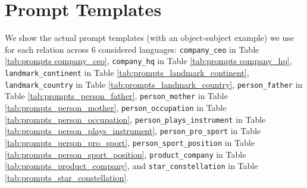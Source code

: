 \section{Prompt Templates}

We show the actual prompt templates (with an object-subject example) we use for each relation across 6 considered languages:
\texttt{company\_ceo} in Table \ref{tab:prompts company_ceo}, 
\texttt{company\_hq} in Table \ref{tab:prompts company_hq},
\texttt{landmark\_continent} in Table \ref{tab:prompts_landmark_continent},
\texttt{landmark\_country} in Table \ref{tab:prompts_landmark_country},
\texttt{person\_father} in Table \ref{tab:prompts_person_father},
\texttt{person\_mother} in Table \ref{tab:prompts_person_mother},
\texttt{person\_occupation} in Table \ref{tab:prompts_person_occupation},
\texttt{person\_plays\_instrument} in Table \ref{tab:prompts_person_plays_instrument},
\texttt{person\_pro\_sport} in Table \ref{tab:prompts_person_pro_sport},
\texttt{person\_sport\_position} in Table \ref{tab:prompts_person_sport_position},
\texttt{product\_company} in Table \ref{tab:prompts_product_company}, and
\texttt{star\_constellation} in Table \ref{tab:prompts_star_constellation}.


